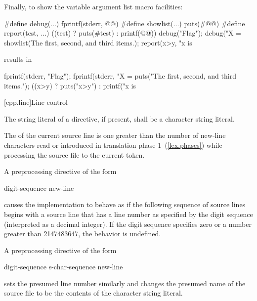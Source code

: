 \pnum
Finally, to show the variable argument list macro facilities:

\begin{codeblock}
#define debug(...) fprintf(stderr, @@)
#define showlist(...) puts(#@@)
#define report(test, ...) ((test) ? puts(#test) : printf(@@))
debug("Flag");
debug("X = %
showlist(The first, second, and third items.);
report(x>y, "x is %
\end{codeblock}

results in

\begin{codeblock}
fprintf(stderr, "Flag");
fprintf(stderr, "X = %
puts("The first, second, and third items.");
((x>y) ? puts("x>y") : printf("x is %
  
\end{codeblock}
\exitnote%

[cpp.line]{Line control}%
%

\pnum
The string literal of a
directive, if present,
shall be a character string literal.

\pnum
The
of the current source line is one greater than
the number of new-line characters read or introduced
in translation phase 1~(\ref{lex.phases})
while processing the source file to the current token.

\pnum
A preprocessing directive of the form

\begin{ncsimplebnf}
 digit-sequence new-line
\end{ncsimplebnf}

causes the implementation to behave as if
the following sequence of source lines begins with a
source line that has a line number as specified
by the digit sequence (interpreted as a decimal integer).
If the digit sequence specifies zero
or a number greater than 2147483647,
the behavior is undefined.

\pnum
A preprocessing directive of the form

\begin{ncsimplebnf}
 digit-sequence  s-char-sequence\opt {} new-line
\end{ncsimplebnf}

sets the presumed line number similarly and changes the
presumed name of the source file to be the contents
of the character string literal.

